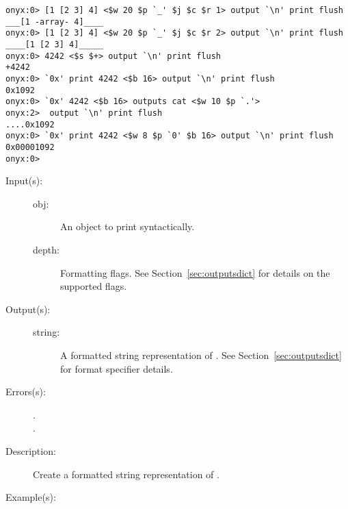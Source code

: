 \begin{description}
\begin{description}
\begin{verbatim}
onyx:0> [1 [2 3] 4] <$w 20 $p `_' $j $c $r 1> output `\n' print flush
___[1 -array- 4]____
onyx:0> [1 [2 3] 4] <$w 20 $p `_' $j $c $r 2> output `\n' print flush
____[1 [2 3] 4]_____
onyx:0> 4242 <$s $+> output `\n' print flush
+4242
onyx:0> `0x' print 4242 <$b 16> output `\n' print flush
0x1092
onyx:0> `0x' 4242 <$b 16> outputs cat <$w 10 $p `.'>
onyx:2>  output `\n' print flush
....0x1092
onyx:0> `0x' print 4242 <$w 8 $p `0' $b 16> output `\n' print flush
0x00001092
onyx:0>
		\end{verbatim}
	\end{description}
\label{systemdict:outputs}
\item[{\onyxop{obj flags}{outputs}{string}}: ]
	\begin{description}\item[]
	\item[Input(s): ]
		\begin{description}\item[]
		\item[obj: ]
			An object to print syntactically.
		\item[depth: ]
			Formatting flags.  See Section~\ref{sec:outputsdict} for
			details on the supported flags.
		\end{description}
	\item[Output(s): ]
		\begin{description}\item[]
		\item[string: ]
			A formatted string representation of .
			See Section~\ref{sec:outputsdict} for format specifier
			details.
		\end{description}
	\item[Errors(s): ]
		\begin{description}\item[]
		\item[.]
		\item[.]
		\end{description}
	\item[Description: ]
		Create a formatted string representation of .
	\item[Example(s): ]\begin{verbatim}


\end{verbatim}
\end{description}
\end{description}
